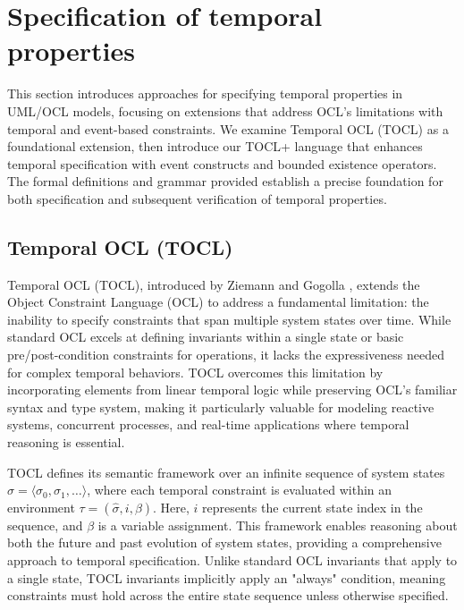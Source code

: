 \section{Specification of temporal properties}
\hspace{1cm} This section introduces approaches for specifying temporal properties 
in UML/OCL models, focusing on extensions that address OCL's limitations with temporal 
and event-based constraints. We examine Temporal OCL (TOCL) as a foundational extension, 
then introduce our TOCL+ language that enhances temporal specification with event 
constructs and bounded existence operators. The formal definitions and grammar 
provided establish a precise foundation for both specification and subsequent 
verification of temporal properties.

\subsection{Temporal OCL (TOCL)}

\hspace{1cm} Temporal OCL (TOCL), introduced by Ziemann and Gogolla \cite{TOCL}, 
extends the Object Constraint Language (OCL) to address a fundamental limitation: 
the inability to specify constraints that span multiple system states over time. 
While standard OCL excels at defining invariants within a single state or basic 
pre/post-condition constraints for operations, it lacks the expressiveness needed 
for complex temporal behaviors. TOCL overcomes this limitation by incorporating 
elements from linear temporal logic while preserving OCL's familiar syntax and type 
system, making it particularly valuable for modeling reactive systems, concurrent 
processes, and real-time applications where temporal reasoning is essential.

TOCL defines its semantic framework over an infinite sequence of system states 
$\hat{\sigma} = \langle \sigma_0, \sigma_1, \ldots \rangle$, where each temporal 
constraint is evaluated within an environment $\tau = (\hat{\sigma}, i, \beta)$. 
Here, $i$ represents the current state index in the sequence, and $\beta$ is a 
variable assignment. This framework enables reasoning about both the future and 
past evolution of system states, providing a comprehensive approach to temporal 
specification. Unlike standard OCL invariants that apply to a single state, TOCL 
invariants implicitly apply an "always" condition, meaning constraints must hold 
across the entire state sequence unless otherwise specified.

